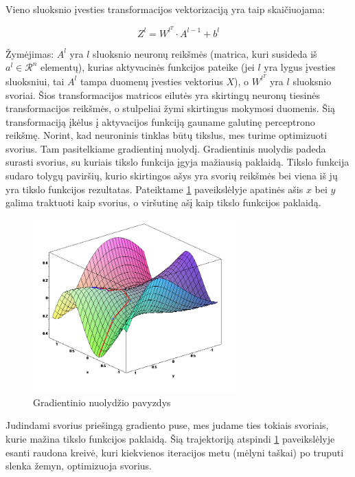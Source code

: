 \documentclass[a4paper, 12pt]{article}
\begin{document}
Vieno sluoksnio įvesties transformacijos vektorizaciją yra taip skaičiuojama:

$$
Z^{l}=W^{{l}^T} \cdot A^{l-1}+b^{l}
$$

Žymėjimas: $A^l$ yra $l$ sluoksnio neuronų reikšmės (matrica, kuri susideda iš $a^l \in \mathcal{R}^n$ elementų), kurias aktyvacinės funkcijos pateike (jei $l$ yra lygus įvesties sluoksniui, tai $A^l$ tampa duomenų įvesties vektorius $X$), o $W^{l^T}$ yra $l$ sluoksnio svoriai.
Šios transformacijos matricos eilutės yra skirtingų neuronų tiesinės transformacijos reikšmės, o stulpeliai žymi skirtingus mokymosi duomenis. Šią transformaciją įkėlus į aktyvacijos funkciją gauname galutinę perceptrono reikšmę.
Norint, kad neuroninis tinklas būtų tikslus, mes turime optimizuoti svorius. Tam pasitelkiame gradientinį nuolydį. Gradientinis nuolydis padeda surasti svorius, su kuriais tikslo funkcija įgyja mažiausią paklaidą. Tikslo funkcija sudaro tolygų paviršių, kurio skirtingos ašys yra svorių reikšmės bei viena iš jų yra tikslo funkcijos rezultatas. Pateiktame \ref{gradientinis nuolydis} paveikslėlyje apatinės ašis $x$ bei $y$ galima traktuoti kaip svorius, o viršutinę ašį kaip tikslo funkcijos paklaidą. 

\begin{figure}[h]
\centering
\includegraphics[width=0.7\textwidth]{gradientinis nuolydis}
\caption{Gradientinio nuolydžio pavyzdys}
\label{gradientinis nuolydis}
\end{figure}

Judindami svorius priešingą gradiento puse, mes judame ties tokiais svoriais, kurie mažina tikslo funkcijos paklaidą. Šią trajektoriją atspindi \ref{gradientinis nuolydis} paveikslėlyje esanti raudona kreivė, kuri kiekvienos iteracijos metu (mėlyni taškai) po truputi slenka žemyn, optimizuoja svorius.
\end{document}
